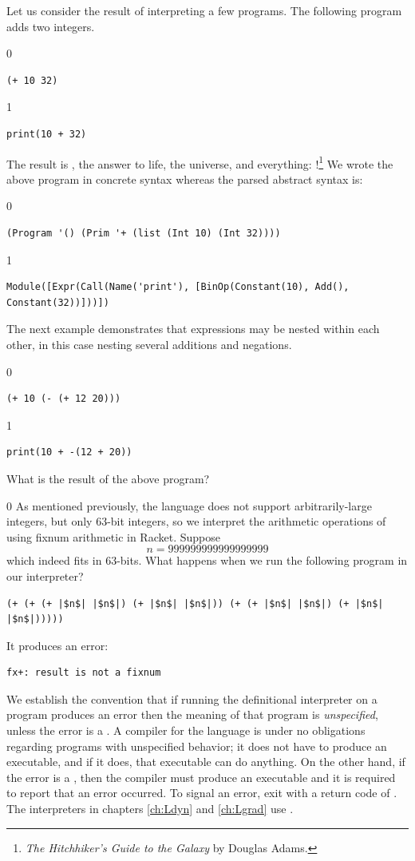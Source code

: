 \documentclass[7x10,nocrop]{TimesAPriori_MIT}%
\def\racketEd{0}
\def\pythonEd{1}
\def\edition{0}
\begin{document}
Let us consider the result of interpreting a few \LangInt{} programs. The
following program adds two integers.
{\if\edition\racketEd
\begin{lstlisting}
(+ 10 32)
\end{lstlisting}
\fi}
{\if\edition\pythonEd
\begin{lstlisting}
print(10 + 32)
\end{lstlisting}
\fi}
%
\noindent The result is , the answer to life, the universe,
and everything: !\footnote{\emph{The Hitchhiker's Guide to
    the Galaxy} by Douglas Adams.}
%
We wrote the above program in concrete syntax whereas the parsed
abstract syntax is:
{\if\edition\racketEd
\begin{lstlisting}
(Program '() (Prim '+ (list (Int 10) (Int 32))))
\end{lstlisting}
\fi}
{\if\edition\pythonEd
\begin{lstlisting}
Module([Expr(Call(Name('print'), [BinOp(Constant(10), Add(), Constant(32))]))])    
\end{lstlisting}
\fi}
The next example demonstrates that expressions may be nested within
each other, in this case nesting several additions and negations.
{\if\edition\racketEd
\begin{lstlisting}
(+ 10 (- (+ 12 20)))
\end{lstlisting}
\fi}
{\if\edition\pythonEd
\begin{lstlisting}
print(10 + -(12 + 20))
\end{lstlisting}
\fi}
%
\noindent What is the result of the above program?

{\if\edition\racketEd
As mentioned previously, the \LangInt{} language does not support
arbitrarily-large integers, but only $63$-bit integers, so we
interpret the arithmetic operations of \LangInt{} using fixnum arithmetic
in Racket.
Suppose
\[
  n = 999999999999999999
\]
which indeed fits in $63$-bits.  What happens when we run the
following program in our interpreter?
\begin{lstlisting}
(+ (+ (+ |$n$| |$n$|) (+ |$n$| |$n$|)) (+ (+ |$n$| |$n$|) (+ |$n$| |$n$|)))))
\end{lstlisting}
It produces an error:
\begin{lstlisting}
fx+: result is not a fixnum
\end{lstlisting}
We establish the convention that if running the definitional
interpreter on a program produces an error then the meaning of that
program is \emph{unspecified}, unless the
error is a . A compiler for the language is under
no obligations regarding programs with unspecified behavior; it does
not have to produce an executable, and if it does, that executable can
do anything.  On the other hand, if the error is a
, then the compiler must produce an executable and
it is required to report that an error occurred. To signal an error,
exit with a return code of .  The interpreters in chapters
\ref{ch:Ldyn} and \ref{ch:Lgrad} use
.
\fi}
\end{document}

